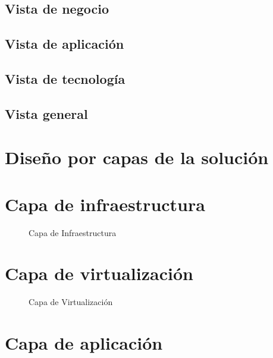 \subsection{Vista de negocio}


\subsection{Vista de aplicación}
%

\subsection{Vista de tecnología}


\subsection{Vista general}
%

\section{Diseño por capas de la solución}

\section{Capa de infraestructura}

\begin{figure}[H]
    \centering
    \caption{Capa de Infraestructura}
\end{figure}

\section{Capa de virtualización}

\begin{figure}[H]
    \centering
    \caption{Capa de Virtualización}
\end{figure}

\section{Capa de aplicación}
